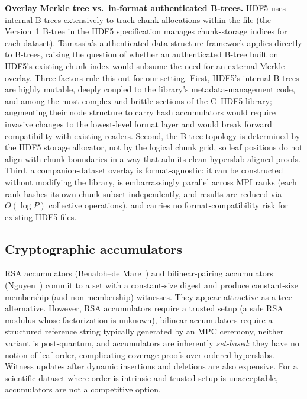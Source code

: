 \documentclass[11pt]{article}
\begin{document}
\noindent\textbf{Overlay Merkle tree vs.\ in-format authenticated B-trees.}
HDF5 uses internal B-trees extensively to track chunk allocations within the
file (the Version~1 B-tree in the HDF5 specification manages chunk-storage
indices for each dataset). Tamassia's authenticated data structure framework
applies directly to B-trees, raising the question of whether an authenticated
B-tree built on HDF5's existing chunk index would subsume the need for an
external Merkle overlay. Three factors rule this out for our setting.
First, HDF5's internal B-trees are highly mutable, deeply coupled to the
library's metadata-management code, and among the most complex and brittle
sections of the C~HDF5 library; augmenting their node structure to carry hash
accumulators would require invasive changes to the lowest-level format layer
and would break forward compatibility with existing readers. Second, the B-tree
topology is determined by the HDF5 storage allocator, not by the logical chunk
grid, so leaf positions do not align with chunk boundaries in a way that admits
clean hyperslab-aligned proofs. Third, a companion-dataset overlay is
format-agnostic: it can be constructed without modifying the library,
is embarrassingly parallel across MPI ranks (each rank hashes its own chunk
subset independently, and results are reduced via $O(\log P)$ collective
operations), and carries no format-compatibility risk for existing HDF5 files.

\subsection{Cryptographic accumulators}

RSA accumulators (Benaloh--de Mare~\cite{benaloh1993accumulator}) and
bilinear-pairing accumulators (Nguyen~\cite{nguyen2005accumulator}) commit to a
set with a constant-size digest and produce constant-size membership (and
non-membership) witnesses. They appear attractive as a tree alternative.
However, RSA accumulators require a trusted setup (a safe RSA modulus whose
factorization is unknown), bilinear accumulators require a structured reference
string typically generated by an MPC ceremony, neither variant is
post-quantum, and accumulators are inherently \emph{set-based}: they have no
notion of leaf order, complicating coverage proofs over ordered hyperslabs.
Witness updates after dynamic insertions and deletions are also expensive.
For a scientific dataset where order is intrinsic and trusted setup is
unacceptable, accumulators are not a competitive option.
\end{document}

